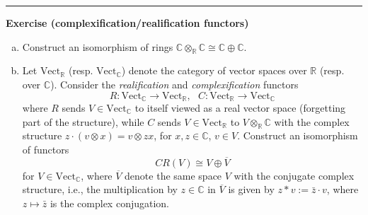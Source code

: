 \documentclass[a4paper, 12pt]{article}
\newenvironment{problem}[2][Exercise]
    { \begin{mdframed}[backgroundcolor=gray!20] \textbf{#1 #2} \\}
    {  \end{mdframed}}
\newcommand{\Vect}{\text{Vect}}
\begin{document}
\noindent\rule{7in}{2.8pt}
\begin{problem}{(complexification/realification functors)}
\begin{enumerate}[(a)]
\item Construct an isomorphism of rings \(\mathbb{C}\otimes_\mathbb{R}\mathbb{C}\cong \mathbb{C}\oplus \mathbb{C}\).
\item Let \(\Vect_\mathbb{R}\) (resp. \(\Vect_\mathbb{C}\)) denote the category of vector spaces over \(\mathbb{R}\) (resp. over \(\mathbb{C}\)). Consider the \textit{realification} and 
\textit{complexification} functors 
\[R:\Vect_\mathbb{C}\rightarrow \Vect_\mathbb{R},\ \ \ C:\Vect_\mathbb{R}\rightarrow \Vect_\mathbb{C}\]
where \(R\) sends \(V\in \Vect_\mathbb{C}\) to itself viewed as a real vector space (forgetting part of the structure), while \(C\) sends \(V\in \Vect_\mathbb{R}\) to \(V\otimes_\mathbb{R}\mathbb{C}\) with the 
complex structure \(z\cdot (v\otimes x)=v\otimes zx\), for \(x,z\in \mathbb{C}\), \(v\in V\). Construct an isomorphism of functors 
\[CR(V)\cong V\oplus \overline{V}\]
for \(V\in \Vect_\mathbb{C}\), where \(\overline{V}\) denote the same space \(V\) with the conjugate complex structure, i.e., the multiplication by \(z\in \mathbb{C}\) in \(\overline{V}\) is given by \(z*v:=\bar{z}\cdot v\), where 
\(z\mapsto \bar{z}\) is the complex conjugation.
\end{enumerate}
\end{problem}
\end{document}
